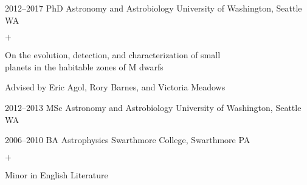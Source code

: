 \documentclass[]{luger-cv} %
\begin{document}
\begin{entrylist}


    \entry
    {2012--2017}
    {PhD {\normalfont Astronomy and Astrobiology}}
    {University of Washington, Seattle WA}
    {%
        \vspace{-1em}
        \begin{list}{$+$}{\cvlist}
            \item On the evolution, detection, and characterization of small \\ planets in the habitable zones of M dwarfs
            \item Advised by Eric Agol, Rory Barnes, and Victoria Meadows
        \end{list}
    }


    \entry
    {2012--2013}
    {MSc {\normalfont Astronomy and Astrobiology}}
    {University of Washington, Seattle WA}


    \entry
    {2006--2010}
    {BA {\normalfont Astrophysics}}
    {Swarthmore College, Swarthmore PA}
    {\vspace{-1em}
        \begin{list}{$+$}{\cvlist}
            \item Minor in English Literature
        \end{list}}


\end{entrylist}


\end{document}
